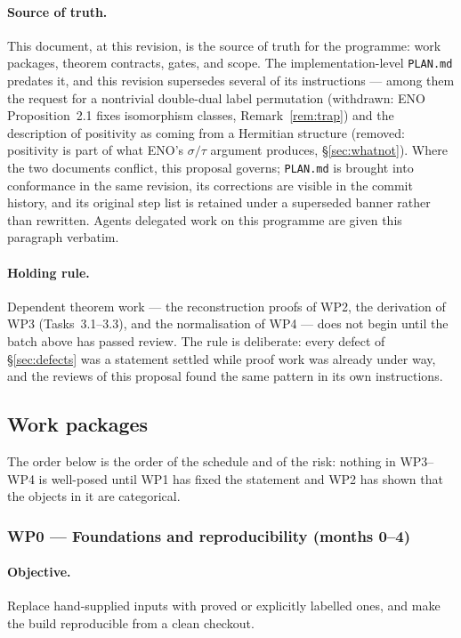 \documentclass[11pt,a4paper]{article}
\theoremstyle{remark}
\begin{document}
\paragraph{Source of truth.} This document, at this revision, is the source of truth for the
programme: work packages, theorem contracts, gates, and scope. The implementation-level
\texttt{PLAN.md} predates it, and this revision supersedes several of its instructions ---
among them the request for a nontrivial double-dual label permutation (withdrawn: ENO
Proposition~2.1 fixes isomorphism classes, Remark~\ref{rem:trap}) and the description of
positivity as coming from a Hermitian structure (removed: positivity is part of what ENO's
$\sigma/\tau$ argument produces, \S\ref{sec:whatnot}). Where the two documents conflict, this
proposal governs; \texttt{PLAN.md} is brought into conformance in the same revision, its
corrections are visible in the commit history, and its original step list is retained under a
superseded banner rather than rewritten. Agents delegated work on this programme are given this
paragraph verbatim.

\paragraph{Holding rule.} Dependent theorem work --- the reconstruction proofs of WP2, the
derivation of WP3 (Tasks~3.1--3.3), and the normalisation of WP4 --- does not begin until the
batch above has passed review. The rule is deliberate: every defect of \S\ref{sec:defects} was a
statement settled while proof work was already under way, and the reviews of this proposal
found the same pattern in its own instructions.

\subsection{Work packages}

The order below is the order of the schedule and of the risk: nothing in WP3--WP4 is
well-posed until WP1 has fixed the statement and WP2 has shown that the objects in it are
categorical.

\subsubsection*{WP0 --- Foundations and reproducibility (months 0--4)}

\paragraph{Objective.} Replace hand-supplied inputs with proved or explicitly labelled ones, and
make the build reproducible from a clean checkout.
\end{document}
